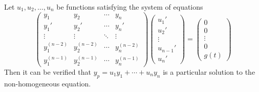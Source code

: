 \documentclass[10pt,UTF8]{article}
\theoremstyle{definition}
\newtheorem{definition inner}{Definition}[section]
\theoremstyle{definition}
\newtheorem{theorem inner}{Theorem}[section]
\theoremstyle{definition}
\newtheorem*{proof inner}{\textit{Proof}}
\theoremstyle{plain}
\newtheorem{tip inner}{Tip}[section]
\theoremstyle{remark}
\begin{document}
Let \(u_1, u_2, \ldots, u_n\) be functions satisfying the system of equations
\begin{equation*}
  \begin{pmatrix}
    y_1 & y_2 & \cdots & y_n \\
    y_1' & y_2' & \cdots & y_n' \\
    \vdots & \vdots & \ddots & \vdots \\
    y_1^{(n-2)} & y_2^{(n-2)} & \cdots & y_n^{(n-2)} \\
    y_1^{(n-1)} & y_2^{(n-1)} & \cdots & y_n^{(n-1)}
  \end{pmatrix}
  \begin{pmatrix}
    u_1' \\
    u_2' \\
    \vdots \\
    u_{n-1}' \\
    u_n'
  \end{pmatrix} =
  \begin{pmatrix}
    0 \\
    0 \\
    \vdots \\
    0 \\
    g(t)
  \end{pmatrix}
\end{equation*}
Then it can be verified that \(y_p = u_1 y_1 + \cdots + u_n y_n\)
is a particular solution to the non-homogeneous equation.
\end{document}

